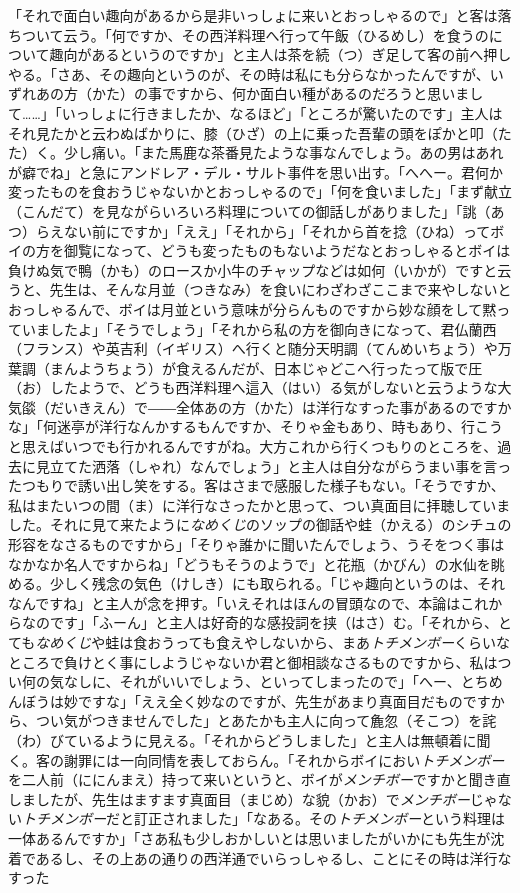 \documentclass{book}
\begin{document}
「それで面白い趣向があるから是非いっしょに来いとおっしゃるので」と客は落ちついて云う。「何ですか、その西洋料理へ行って午飯（ひるめし）を食うのについて趣向があるというのですか」と主人は茶を続（つ）ぎ足して客の前へ押しやる。「さあ、その趣向というのが、その時は私にも分らなかったんですが、いずれあの方（かた）の事ですから、何か面白い種があるのだろうと思いまして\ldots{}\ldots{}」「いっしょに行きましたか、なるほど」「ところが驚いたのです」主人はそれ見たかと云わぬばかりに、膝（ひざ）の上に乗った吾輩の頭をぽかと叩（たた）く。少し痛い。「また馬鹿な茶番見たような事なんでしょう。あの男はあれが癖でね」と急にアンドレア・デル・サルト事件を思い出す。「へへー。君何か変ったものを食おうじゃないかとおっしゃるので」「何を食いました」「まず献立（こんだて）を見ながらいろいろ料理についての御話しがありました」「誂（あつ）らえない前にですか」「ええ」「それから」「それから首を捻（ひね）ってボイの方を御覧になって、どうも変ったものもないようだなとおっしゃるとボイは負けぬ気で鴨（かも）のロースか小牛のチャップなどは如何（いかが）ですと云うと、先生は、そんな月並（つきなみ）を食いにわざわざここまで来やしないとおっしゃるんで、ボイは月並という意味が分らんものですから妙な顔をして黙っていましたよ」「そうでしょう」「それから私の方を御向きになって、君仏蘭西（フランス）や英吉利（イギリス）へ行くと随分天明調（てんめいちょう）や万葉調（まんようちょう）が食えるんだが、日本じゃどこへ行ったって版で圧（お）したようで、どうも西洋料理へ這入（はい）る気がしないと云うような大気燄（だいきえん）で――全体あの方（かた）は洋行なすった事があるのですかな」「何迷亭が洋行なんかするもんですか、そりゃ金もあり、時もあり、行こうと思えばいつでも行かれるんですがね。大方これから行くつもりのところを、過去に見立てた洒落（しゃれ）なんでしょう」と主人は自分ながらうまい事を言ったつもりで誘い出し笑をする。客はさまで感服した様子もない。「そうですか、私はまたいつの間（ま）に洋行なさったかと思って、つい真面目に拝聴していました。それに見て来たように\emph{なめくじ}のソップの御話や蛙（かえる）のシチュの形容をなさるものですから」「そりゃ誰かに聞いたんでしょう、うそをつく事はなかなか名人ですからね」「どうもそうのようで」と花瓶（かびん）の水仙を眺める。少しく残念の気色（けしき）にも取られる。「じゃ趣向というのは、それなんですね」と主人が念を押す。「いえそれはほんの冒頭なので、本論はこれからなのです」「ふーん」と主人は好奇的な感投詞を挟（はさ）む。「それから、とても\emph{なめくじ}や蛙は食おうっても食えやしないから、まあ\emph{トチメンボー}くらいなところで負けとく事にしようじゃないか君と御相談なさるものですから、私はつい何の気なしに、それがいいでしょう、といってしまったので」「へー、とちめんぼうは妙ですな」「ええ全く妙なのですが、先生があまり真面目だものですから、つい気がつきませんでした」とあたかも主人に向って麁忽（そこつ）を詫（わ）びているように見える。「それからどうしました」と主人は無頓着に聞く。客の謝罪には一向同情を表しておらん。「それからボイにおい\emph{トチメンボー}を二人前（ににんまえ）持って来いというと、ボイが\emph{メンチボー}ですかと聞き直しましたが、先生はますます真面目（まじめ）な貌（かお）で\emph{メンチボー}じゃない\emph{トチメンボー}だと訂正されました」「なある。その\emph{トチメンボー}という料理は一体あるんですか」「さあ私も少しおかしいとは思いましたがいかにも先生が沈着であるし、その上あの通りの西洋通でいらっしゃるし、ことにその時は洋行なすった
\end{document}
